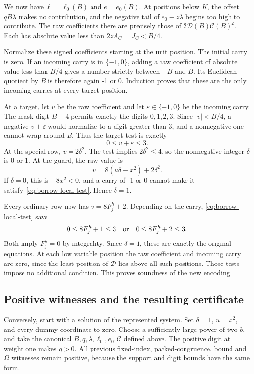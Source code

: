 We now have $\ell=\ell_0(B)$ and $e=e_0(B)$.
At positions below $K$, the offset $qB\lambda$ makes no contribution,
and the negative tail of $e_0-z\lambda$ begins too high to contribute.
The raw coefficients there are precisely those of
$2\mathcal D(B)\mathcal C(B)^2$. Each has absolute value less than
$2zA_C=J_C<B/4$.

Normalize these signed coefficients starting at the unit position.
The initial carry is zero. If an incoming carry is in $\{-1,0\}$,
adding a raw coefficient of absolute value less than $B/4$ gives a
number strictly between $-B$ and $B$. Its Euclidean quotient by $B$
is therefore again -1 or 0. Induction proves that these are the only
incoming carries at every target position.

At a target, let $v$ be the raw coefficient and let
$\varepsilon\in\{-1,0\}$ be the incoming carry. The mask digit
$B-4$ permits exactly the digits $0,1,2,3$. Since $|v|<B/4$, a
negative $v+\varepsilon$ would normalize to a digit greater than 3,
and a nonnegative one cannot wrap around $B$. Thus the target test is
exactly
\begin{equation}\label{eq:borrow-local-test}
 0\le v+\varepsilon\le3.
\end{equation}
At the special row, $v=2\delta^2$. The test implies
$2\delta^2\le4$, so the nonnegative integer $\delta$ is 0 or 1.
At the guard, the raw value is
\[
 v=8(u\delta-x^2)+2\delta^2.
\]
If $\delta=0$, this is $-8x^2<0$, and a carry of -1 or 0 cannot
make it satisfy~\eqref{eq:borrow-local-test}. Hence $\delta=1$.

Every ordinary row now has $v=8F_j^h+2$. Depending on the carry,
\eqref{eq:borrow-local-test} says
\[
 0\le8F_j^h+1\le3
 \quad\hbox{or}\quad
 0\le8F_j^h+2\le3.
\]
Both imply $F_j^h=0$ by integrality. Since $\delta=1$, these are
exactly the original equations. At each low variable position the
raw coefficient and incoming carry are zero, since the least position
of $\mathcal D$ lies above all such positions. Those tests impose no
additional condition. This proves soundness of the new encoding.

\subsection{Positive witnesses and the resulting certificate}

Conversely, start with a solution of the represented system. Set
$\delta=1$, $u=x^2$, and every dummy coordinate to zero. Choose a
sufficiently large power of two $b$, and take the canonical
$B,q,\lambda,\ell_0,e_0,\mathcal C$ defined above. The positive digit
at weight one makes $g>0$. All previous fixed-index, packed-congruence,
bound and $\Omega$ witnesses remain positive, because the support and
digit bounds have the same form.

